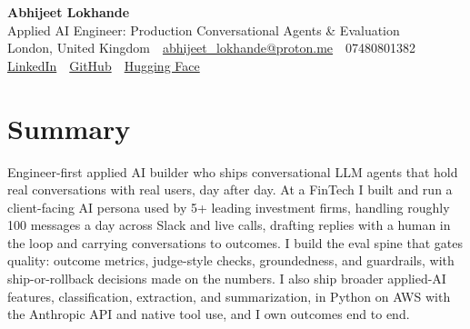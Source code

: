 \documentclass[10pt,a4paper]{article}
\newcommand{\sep}{\,\textcolor{accent!60}{\textbar}\,}
\begin{document}
\begin{center}
  {\fontsize{24}{26}\selectfont\bfseries Abhijeet Lokhande}\\[3pt]
  {\color{accent}\large Applied AI Engineer: Production Conversational Agents \& Evaluation}\\[5pt]
  {\small
    London, United Kingdom \sep
    \href{mailto:abhijeet_lokhande@proton.me}{abhijeet\_lokhande@proton.me} \sep
    07480801382 \\[2pt]
    \href{https://www.linkedin.com/in/ablds/}{LinkedIn} \sep
    \href{https://github.com/abhijeetscode}{GitHub} \sep
    \href{https://huggingface.co/ab-ai}{Hugging Face}
  }
\end{center}
\vspace{2pt}

\section{Summary}
Engineer-first applied AI builder who ships conversational LLM agents that hold real conversations with real users, day after day. At a FinTech I built and run a client-facing AI persona used by 5+ leading investment firms, handling roughly 100 messages a day across Slack and live calls, drafting replies with a human in the loop and carrying conversations to outcomes. I build the eval spine that gates quality: outcome metrics, judge-style checks, groundedness, and guardrails, with ship-or-rollback decisions made on the numbers. I also ship broader applied-AI features, classification, extraction, and summarization, in Python on AWS with the Anthropic API and native tool use, and I own outcomes end to end.

\end{document}
